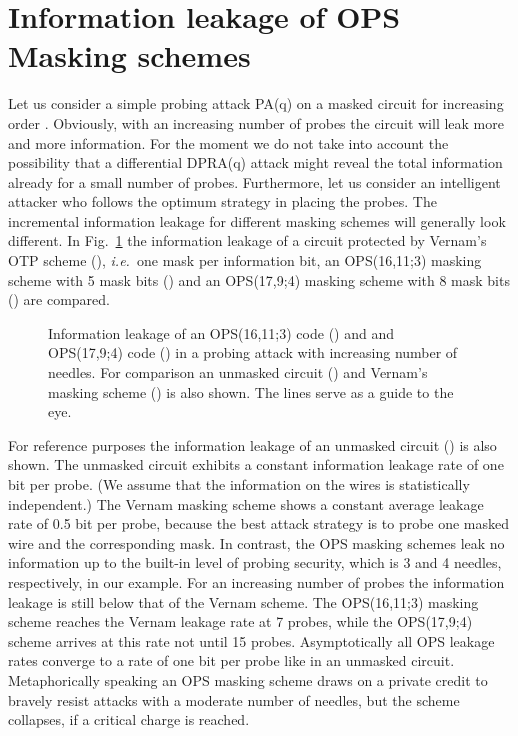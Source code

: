 \documentclass[11pt]{llncs}
\newcommand{\ie}{{\it i.e.\ }}
\begin{document}
\section{Information leakage of OPS Masking schemes}\label{Sec:Leakage}
Let us consider a simple probing attack PA(q) on a masked circuit
for increasing order .
Obviously, with an increasing number of probes  the circuit
will leak more and more information.
For the moment we do not take into account the possibility that a differential
DPRA(q) attack might reveal the total information already for a small number of probes.
Furthermore, let us consider an intelligent attacker
who follows the optimum strategy in placing the probes.
The incremental information leakage for different masking schemes will
generally look different.
In Fig.~\ref{Fig:InformationLeakage} the information leakage of a circuit
protected by Vernam's OTP scheme (), \ie one mask per information bit,
an OPS(16,11;3) masking scheme with 5 mask bits () and
an OPS(17,9;4) masking scheme with 8 mask bits ()
are compared.
\begin{figure}[thb]
\centering {}
\caption{Information leakage of an OPS(16,11;3) code () and
         and OPS(17,9;4) code ()
         in a probing attack with increasing number of needles.
         For comparison an unmasked circuit ()
         and Vernam's masking scheme () is also shown.
         The lines serve as a guide to the eye.}
\label{Fig:InformationLeakage}
\end{figure}
For reference purposes the information leakage of an
unmasked circuit () is also shown. The unmasked circuit
exhibits a constant information leakage rate of one bit per probe.
(We assume that the information on the wires is statistically independent.)
The Vernam masking scheme shows a constant average leakage
rate of 0.5 bit per probe, because the best attack strategy is to probe
one masked wire and the corresponding mask.
In contrast, the OPS masking schemes leak no information up to
the built-in level of probing security,
which is 3 and 4 needles, respectively, in our example.
For an increasing number of probes the information leakage
is still below that of the Vernam scheme.
The OPS(16,11;3) masking scheme reaches the
Vernam leakage rate at 7 probes, while the OPS(17,9;4) scheme
arrives at this rate not until 15 probes.
Asymptotically all OPS leakage rates converge
to a rate of one bit per probe like in an unmasked circuit.
Metaphorically speaking an OPS masking scheme
draws on a private credit to bravely resist attacks with a
moderate number of needles, but the scheme collapses,
if a critical charge is reached.
\end{document}
